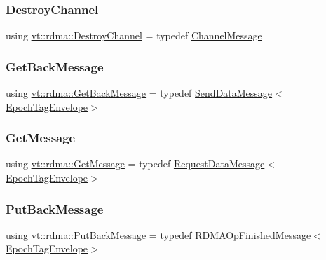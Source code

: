 \subsubsection{\texorpdfstring{Destroy\+Channel}{DestroyChannel}}
{\footnotesize\ttfamily using \hyperlink{namespacevt_1_1rdma_a1273aeddd73c1ffac0d7383ef7a314d8}{vt\+::rdma\+::\+Destroy\+Channel} = typedef \hyperlink{structvt_1_1rdma_1_1_channel_message}{Channel\+Message}}

\mbox{\label{namespacevt_1_1rdma_a72a94b92eba75ec9fec43b2a9a4ad878}} 
\subsubsection{\texorpdfstring{Get\+Back\+Message}{GetBackMessage}}
{\footnotesize\ttfamily using \hyperlink{namespacevt_1_1rdma_a72a94b92eba75ec9fec43b2a9a4ad878}{vt\+::rdma\+::\+Get\+Back\+Message} = typedef \hyperlink{structvt_1_1rdma_1_1_send_data_message}{Send\+Data\+Message}$<$\hyperlink{namespacevt_af23b58014ced6898422213a0e5e6a27a}{Epoch\+Tag\+Envelope}$>$}

\mbox{\label{namespacevt_1_1rdma_acce0da4c9ea1233c3f132c1971943653}} 
\subsubsection{\texorpdfstring{Get\+Message}{GetMessage}}
{\footnotesize\ttfamily using \hyperlink{namespacevt_1_1rdma_acce0da4c9ea1233c3f132c1971943653}{vt\+::rdma\+::\+Get\+Message} = typedef \hyperlink{structvt_1_1rdma_1_1_request_data_message}{Request\+Data\+Message}$<$\hyperlink{namespacevt_af23b58014ced6898422213a0e5e6a27a}{Epoch\+Tag\+Envelope}$>$}

\mbox{\label{namespacevt_1_1rdma_a07a52401fe8185d190371b3333dc61ac}} 
\subsubsection{\texorpdfstring{Put\+Back\+Message}{PutBackMessage}}
{\footnotesize\ttfamily using \hyperlink{namespacevt_1_1rdma_a07a52401fe8185d190371b3333dc61ac}{vt\+::rdma\+::\+Put\+Back\+Message} = typedef \hyperlink{structvt_1_1rdma_1_1_r_d_m_a_op_finished_message}{R\+D\+M\+A\+Op\+Finished\+Message}$<$\hyperlink{namespacevt_af23b58014ced6898422213a0e5e6a27a}{Epoch\+Tag\+Envelope}$>$}

